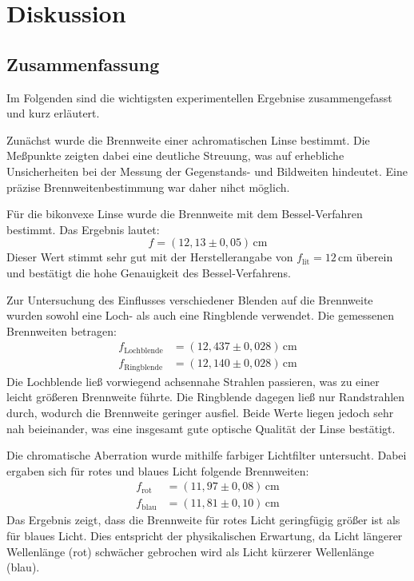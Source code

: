 \chapter{Diskussion}
\label{ch:diskussion}

\section{Zusammenfassung}

Im Folgenden sind die wichtigsten experimentellen Ergebnise zusammengefasst und kurz erläutert. 

Zunächst wurde die Brennweite einer achromatischen Linse bestimmt. Die Meßpunkte zeigten dabei eine deutliche Streuung, was auf erhebliche Unsicherheiten bei der Messung der Gegenstands- und Bildweiten hindeutet. Eine präzise Brennweitenbestimmung war daher nihct möglich.

Für die bikonvexe Linse wurde die Brennweite mit dem Bessel-Verfahren bestimmt. Das Ergebnis lautet:
\begin{equation}
    f = (12{,}13 \pm 0{,}05)\,\mathrm{cm}
\end{equation}
Dieser Wert stimmt sehr gut mit der Herstellerangabe von $f_{\text{lit}} = 12\,\mathrm{cm}$ überein und bestätigt die hohe Genauigkeit des Bessel-Verfahrens.

Zur Untersuchung des Einflusses verschiedener Blenden auf die Brennweite wurden sowohl eine Loch- als auch eine Ringblende verwendet. Die gemessenen Brennweiten betragen:
\begin{align}
    f_{\text{Lochblende}} &= (12{,}437 \pm 0{,}028)\,\mathrm{cm} \\
    f_{\text{Ringblende}} &= (12{,}140 \pm 0{,}028)\,\mathrm{cm}
\end{align}
Die Lochblende ließ vorwiegend achsennahe Strahlen passieren, was zu einer leicht größeren Brennweite führte. Die Ringblende dagegen ließ nur Randstrahlen durch, wodurch die Brennweite geringer ausfiel. Beide Werte liegen jedoch sehr nah beieinander, was eine insgesamt gute optische Qualität der Linse bestätigt.

Die chromatische Aberration wurde mithilfe farbiger Lichtfilter untersucht. Dabei ergaben sich für rotes und blaues Licht folgende Brennweiten:
\begin{align}
    f_{\text{rot}} &= (11{,}97 \pm 0{,}08)\,\mathrm{cm} \\
    f_{\text{blau}} &= (11{,}81 \pm 0{,}10)\,\mathrm{cm}
\end{align}
Das Ergebnis zeigt, dass die Brennweite für rotes Licht geringfügig größer ist als für blaues Licht. Dies entspricht der physikalischen Erwartung, da Licht längerer Wellenlänge (rot) schwächer gebrochen wird als Licht kürzerer Wellenlänge (blau).

